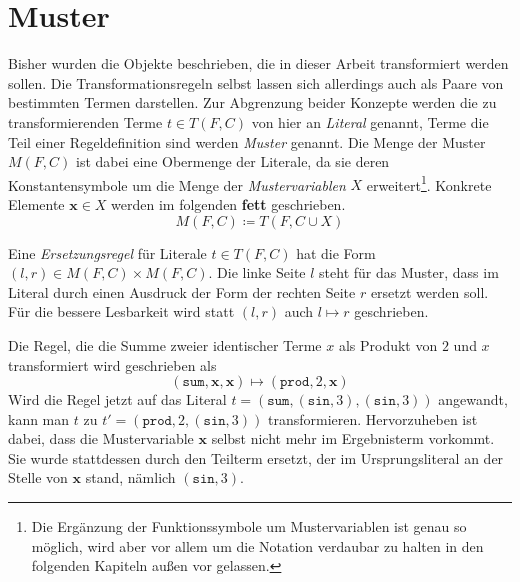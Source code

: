 \section{Muster} \label{subsecMuster}

Bisher wurden die Objekte beschrieben, die in dieser Arbeit transformiert werden sollen. Die Transformationsregeln selbst lassen sich allerdings auch als Paare von bestimmten Termen darstellen. Zur Abgrenzung beider Konzepte werden die zu transformierenden Terme $t\in T(F, C)$ von hier an \emph{Literal} genannt, Terme die  Teil einer Regeldefinition sind werden \emph{Muster} genannt. Die Menge der Muster $M(F, C)$ ist dabei eine Obermenge der Literale, da sie deren Konstantensymbole um die Menge der \emph{Mustervariablen} $X$ erweitert\footnote{Die Ergänzung der Funktionssymbole um Mustervariablen ist genau so möglich, wird aber vor allem um die Notation verdaubar zu halten in den folgenden Kapiteln außen vor gelassen.}. Konkrete Elemente $\mathbf x \in X$ werden im folgenden \textbf{fett} geschrieben.
$$M(F, C) \coloneqq T(F, C \cup X)$$

Eine \emph{Ersetzungsregel} für Literale $t \in T(F, C)$ hat die Form $(l, r) \in M(F, C) \times M(F, C)$. Die linke Seite $l$ steht für das Muster, dass im Literal durch einen Ausdruck der Form der rechten Seite $r$ ersetzt werden soll. Für die bessere Lesbarkeit wird statt $(l, r)$ auch $l \mapsto r$ geschrieben.

\begin{beispiel} \label{bMuster}
Die Regel, die die Summe zweier identischer Terme $x$ als Produkt von $2$ und $x$ transformiert wird geschrieben als
$$(\texttt{sum}, \mathbf x, \mathbf x) \mapsto (\texttt{prod}, 2, \mathbf x)$$
Wird die Regel jetzt auf das Literal 
$t = (\texttt{sum}, (\texttt{sin}, 3), (\texttt{sin}, 3))$ angewandt, kann man $t$ zu $t' = (\texttt{prod}, 2, (\texttt{sin}, 3))$ transformieren. 
Hervorzuheben ist dabei, dass die Mustervariable $\mathbf x$ selbst nicht mehr im Ergebnisterm vorkommt. Sie wurde stattdessen durch den Teilterm ersetzt, der im Ursprungsliteral an der Stelle von $\mathbf x$ stand, nämlich $(\texttt{sin}, 3)$.
\end{beispiel}


